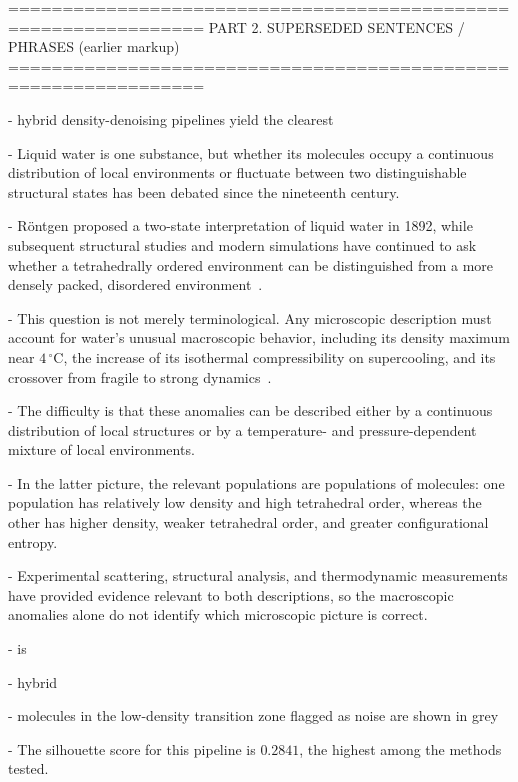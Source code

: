 
================================================================
 PART 2.  SUPERSEDED SENTENCES / PHRASES (earlier \delete markup)
================================================================

- hybrid density-denoising pipelines yield the clearest

- Liquid water is one substance, but whether its molecules occupy a continuous distribution of local environments or fluctuate between two distinguishable structural states has been debated since the nineteenth century.

- R{\"o}ntgen proposed a two-state interpretation of liquid water in 1892, while subsequent structural studies and modern simulations have continued to ask whether a tetrahedrally ordered environment can be distinguished from a more densely packed, disordered environment~\cite{rontgen-1892,whiting-1883,narten_observed_1969}.

- This question is not merely terminological. Any microscopic description must account for water's unusual macroscopic behavior, including its density maximum near $4\,^{\circ}$C, the increase of its isothermal compressibility on supercooling, and its crossover from fragile to strong dynamics~\cite{gallo_water_2016}.

- The difficulty is that these anomalies can be described either by a continuous distribution of local structures or by a temperature- and pressure-dependent mixture of local environments.

- In the latter picture, the relevant populations are populations of molecules: one population has relatively low density and high tetrahedral order, whereas the other has higher density, weaker tetrahedral order, and greater configurational entropy.

- Experimental scattering, structural analysis, and thermodynamic measurements have provided evidence relevant to both descriptions, so the macroscopic anomalies alone do not identify which microscopic picture is correct.

- is

- hybrid

- molecules in the low-density transition zone
    flagged as noise are shown in grey

- The silhouette score for this
    pipeline is $0.2841$, the highest among the methods tested.


